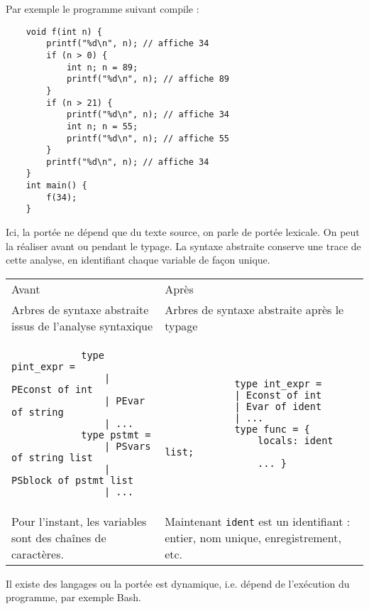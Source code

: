 \documentclass{cours}
\begin{document}
Par exemple le programme suivant compile :
\begin{verbatim}
    void f(int n) {
        printf("%d\n", n); // affiche 34
        if (n > 0) {
            int n; n = 89;
            printf("%d\n", n); // affiche 89
        }
        if (n > 21) {
            printf("%d\n", n); // affiche 34
            int n; n = 55;
            printf("%d\n", n); // affiche 55
        }
        printf("%d\n", n); // affiche 34
    }
    int main() {
        f(34);
    }
\end{verbatim}
Ici, la portée ne dépend que du texte source, on parle de portée lexicale. On peut la réaliser avant ou pendant le typage. La syntaxe abstraite conserve une trace de cette analyse, en identifiant chaque variable de façon unique.
\begin{center}
    \begin{tabular}{p{.4\linewidth}p{.4\linewidth}}
        Avant                                                         & Après                                                                                   \\
        Arbres de syntaxe abstraite issus de l'analyse syntaxique     & Arbres de syntaxe abstraite après le typage                                             \\
        \begin{verbatim}
            type pint_expr =
                | PEconst of int
                | PEvar of string
                | ...
            type pstmt =
                | PSvars of string list
                | PSblock of pstmt list
                | ...
        \end{verbatim}
                                                                      &
        \begin{verbatim}
            type int_expr =
            | Econst of int
            | Evar of ident
            | ...
            type func = {
                locals: ident list;
                ... }
        \end{verbatim}
        \\
        Pour l'instant, les variables sont des chaînes de caractères. & Maintenant \texttt{ident} est un identifiant : entier, nom unique, enregistrement, etc.
    \end{tabular}
\end{center}

Il existe des langages ou la portée est dynamique, i.e. dépend de l'exécution du programme, par exemple Bash.
\end{document}
